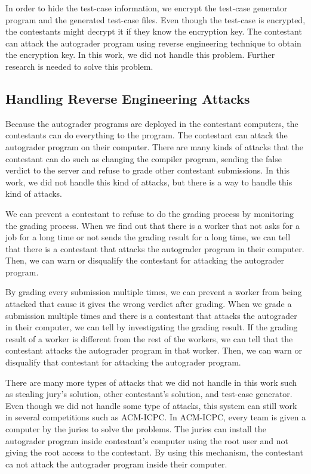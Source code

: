 \documentclass[conference,a4paper]{IEEEtran}
\begin{document}
In order to hide the test-case information, we encrypt the test-case generator program and the generated test-case files. Even though the test-case is encrypted, the contestants might decrypt it if they know the encryption key. The contestant can attack the autograder program using reverse engineering technique to obtain the encryption key. In this work, we did not handle this problem. Further research is needed to solve this problem.

\subsection{Handling Reverse Engineering Attacks}

Because the autograder programs are deployed in the contestant computers, the contestants can do everything to the program. The contestant can attack the autograder program on their computer. There are many kinds of attacks that the contestant can do such as changing the compiler program, sending the false verdict to the server and refuse to grade other contestant submissions. In this work, we did not handle this kind of attacks, but there is a way to handle this kind of attacks.

We can prevent a contestant to refuse to do the grading process by monitoring the grading process. When we find out that there is a worker that not asks for a job for a long time or not sends the grading result for a long time, we can tell that there is a contestant that attacks the autograder program in their computer. Then, we can warn or disqualify the contestant for attacking the autograder program.

By grading every submission multiple times, we can prevent a worker from being attacked that cause it gives the wrong verdict after grading. When we grade a submission multiple times and there is a contestant that attacks the autograder in their computer, we can tell by investigating the grading result. If the grading result of a worker is different from the rest of the workers, we can tell that the contestant attacks the autograder program in that worker. Then, we can warn or disqualify that contestant for attacking the autograder program.

There are many more types of attacks that we did not handle in this work such as stealing jury's solution, other contestant's solution, and test-case generator. Even though we did not handle some type of attacks, this system can still work in several competitions such as ACM-ICPC. In ACM-ICPC, every team is given a computer by the juries to solve the problems. The juries can install the autograder program inside contestant's computer using the root user and not giving the root access to the contestant. By using this mechanism, the contestant ca not attack the autograder program inside their computer.
\end{document}
